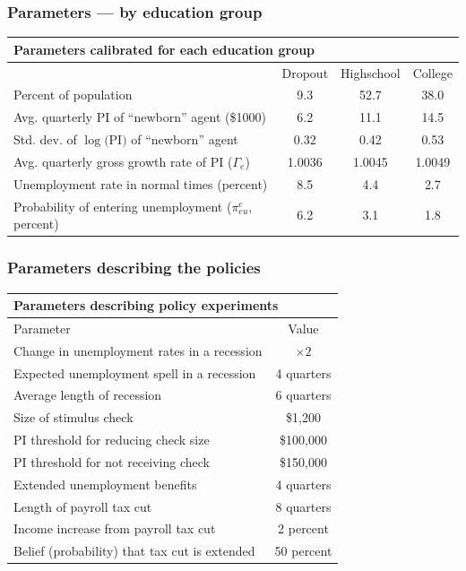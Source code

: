 \documentclass[pdflatex,aspectratio=169]{beamer}
\begin{document}
\begin{frame}
	\frametitle{Parameters --- by education group}
	\label{sli:paramsByEd}
	\begin{table}
		\small
		\begin{tabular}{lccc}
			\toprule 
			\multicolumn{4}{l}{Parameters calibrated for each education group} \\ \midrule
			& Dropout & Highschool & College \\ \midrule
			Percent of population & \phantom{0}9.3 & 52.7 & 38.0 \\ 
			Avg. quarterly PI of ``newborn'' agent (\$1000) & \phantom{0}6.2 & 11.1 & 14.5 \\
			Std. dev. of $\log($PI$)$ of ``newborn'' agent & 0.32 & 0.42 & 0.53 \\
			Avg. quarterly gross growth rate of PI ($\Gamma_e$) & 1.0036 & 1.0045 & 1.0049 \\
			Unemployment rate in normal times (percent) & \phantom{0}8.5 & \phantom{0}4.4 & \phantom{0}2.7 \\ 
			Probability of entering unemployment ($\pi_{eu}^{e}$, percent) & \phantom{0}6.2 & \phantom{0}3.1 & \phantom{0}1.8 
			\\ \bottomrule 
		\end{tabular}
	\end{table}

	\vspace{1cm}
	\hyperlink{ConsistentWithMicroData}{}
\end{frame}


\begin{frame}
	\frametitle{Parameters describing the policies}
	\label{sli:policies}
	\centering 
	\begin{tabular}{lc}
		\toprule 
		\multicolumn{2}{l}{Parameters describing policy experiments} \\ \midrule 
		Parameter & Value \\ \midrule 
		Change in unemployment rates in a recession & $\times 2$ \\ 
		Expected unemployment spell in a recession & 4 quarters \\ 
		Average length of recession & 6 quarters \\ 
		Size of stimulus check & \$1,200 \\ 
		PI threshold for reducing check size & \$100,000 \\ 
		PI threshold for not receiving check & \$150,000 \\ 
		Extended unemployment benefits & 4 quarters \\
		Length of payroll tax cut & 8 quarters \\ 
		Income increase from payroll tax cut & 2 percent \\ 
		Belief (probability) that tax cut is extended & 50 percent 		
		\\ \bottomrule
	\end{tabular}

	\vspace{1cm}
	\hyperlink{Parameters}{} 
\end{frame}
\end{document}

